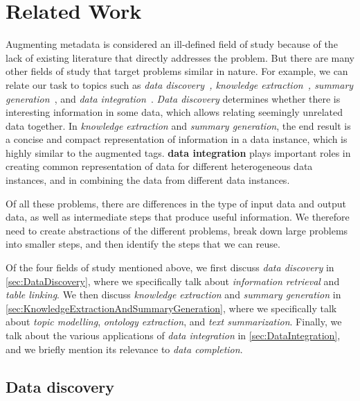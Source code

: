 
\chapter{Related Work}
\label{ch:RelatedWork}

Augmenting metadata is considered an ill-defined field of study because of the lack of existing literature that directly addresses the problem. But there are many other fields of study that target problems similar in nature. For example, we can relate our task to topics such as \textit{data discovery~\cite{Miller2018MakingOD}, knowledge extraction~\cite{Zhang2018Managing}, summary generation~\cite{Yu2006Schema}}, and \textit{data integration~\cite{Levy1996Querying}}. \textit{Data discovery} determines whether there is interesting information in some data, which allows relating seemingly unrelated data together. In \textit{knowledge extraction} and \textit{summary generation}, the end result is a concise and compact representation of information in a data instance, which is highly similar to the augmented tags. \textbf{\Gls{data integration}} plays important roles in creating common representation of data for different heterogeneous data instances, and in combining the data from different data instances.

Of all these problems, there are differences in the type of input data and output data, as well as intermediate steps that produce useful information. We therefore need to create abstractions of the different problems, break down large problems into smaller steps, and then identify the steps that we can reuse.

Of the four fields of study mentioned above, we first discuss \textit{data discovery} in \autoref{sec:DataDiscovery}, where we specifically talk about \textit{information retrieval} and \textit{table linking}. We then discuss \textit{knowledge extraction} and \textit{summary generation} in \autoref{sec:KnowledgeExtractionAndSummaryGeneration}, where we specifically talk about \textit{topic modelling}, \textit{ontology extraction}, and \textit{text summarization}. Finally, we talk about the various applications of \textit{data integration} in \autoref{sec:DataIntegration}, and we briefly mention its relevance to \textit{data completion}.

\section{Data discovery}
\label{sec:DataDiscovery}

